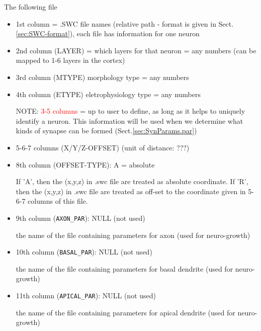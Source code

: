 The following file
\begin{itemize}
  \item 1st column = .SWC file names (relative path -
  format is given in Sect.\ref{sec:SWC-format}), each file has information for
  one neuron
  
  \item 2nd column (LAYER) = which layers for that neuron = any numbers (can be
  mapped to 1-6 layers in the cortex)
  
  \item 3rd column (MTYPE) morphology type = any numbers  
  

  
  \item 4th column (ETYPE) eletrophysiology type = any numbers 
  
  NOTE: \textcolor{red}{3-5 columns} = up to user to define, as long as it helps
  to uniquely identify a neuron. This information will be used when we determine
  what kinds of synapse can be
formed (Sect.\ref{sec:SynParams.par})
  
  \item 5-6-7 columns (X/Y/Z-OFFSET) (unit of distance: ???)
  
  \item 8th column (OFFSET-TYPE): A = absolute
  
If 'A', then the (x,y,z) in .swc file are treated as absolute coordinate.
If 'R', then the (x,y,z) in .swc file are treated as off-set to the coordinate
given in 5-6-7 columns of this file.
  
  \item 9th column (\verb!AXON_PAR!): NULL (not used)
  
  the name of the file containing parameters for axon (used for neuro-growth)
    
  \item 10th column (\verb!BASAL_PAR!): NULL (not used)

  the name of the file containing parameters for basal dendrite (used for
  neuro-growth)
  
  \item 11th column (\verb!APICAL_PAR!): NULL (not used)
  
  the name of the file containing parameters for apical dendrite (used for
  neuro-growth)
  
\end{itemize}

